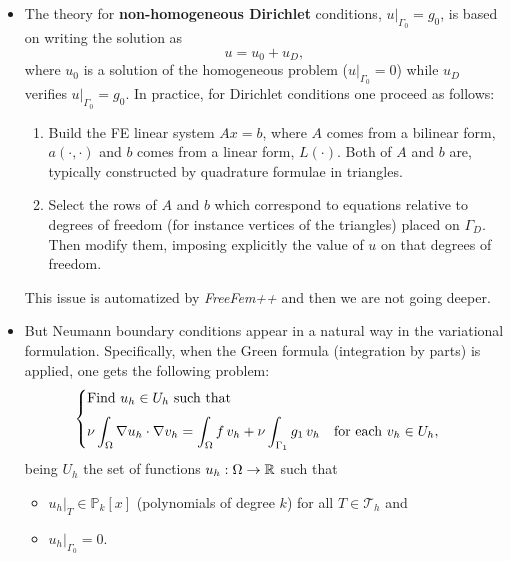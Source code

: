 \documentclass[12pt]{article}
\newcommand{\FF}{\textit{FreeFem++}\xspace}
\begin{document}
\begin{itemize}
\item The theory for \textbf{non-homogeneous Dirichlet} conditions,
  $u|_{\Gamma_0}=g_0$, is based on writing the solution as
  $$
  u = u_0 + u_D,
  $$
  where $u_0$ is a solution of the homogeneous problem
  ($u|_{\Gamma_0}=0$) while $u_D$ verifies $u|_{\Gamma_0}=g_0$.
  In practice, for Dirichlet conditions one proceed as follows:
  \begin{enumerate}
  \item Build the FE linear system $Ax=b$, where $A$ comes from a
    bilinear form, $a(\cdot,\cdot)$ and $b$ comes from a linear form,
    $L(\cdot)$. Both of $A$ and $b$ are, typically constructed by
    quadrature formulae in triangles.
  \item Select the rows of $A$ and $b$ which correspond to equations
    relative to degrees of freedom (for instance vertices of the
    triangles) placed on $\Gamma_D$. Then modify them, imposing
    explicitly the value of $u$ on that degrees of freedom.
  \end{enumerate}
  This issue is automatized by \FF and then we are not going
  deeper.

\item But Neumann boundary conditions appear in a natural way in the
  variational formulation. Specifically, when the Green formula
  (integration by parts) is applied, one gets the following problem:
  \begin{equation*}
      \begin{cases}
      \text{Find $u_h\in U_{h}$ such that}
      \\\noalign{\medskip}
      \begin{aligned}
        \nu\int_\Omega \nabla u_h \cdot \nabla v_h = \int_\Omega f\, v_h
        + \nu\int_{\Gamma_1} g_1\, v_h
        \quad\text{for each } v_h\in U_{h},
      \end{aligned}
    \end{cases}
  \end{equation*}
  being $U_h$ the set of functions $u_h:\Omega\to{\mathbb R}$ such that
  \begin{itemize}
  \item $u_h|_T \in \mathbb{P}_k[x]$ (polynomials of degree $k$) for
    all $T\in \mathcal{T}_h$ and
  \item $u_h|_{\Gamma_0}=0$.
  \end{itemize}
\end{itemize}
\end{document}
